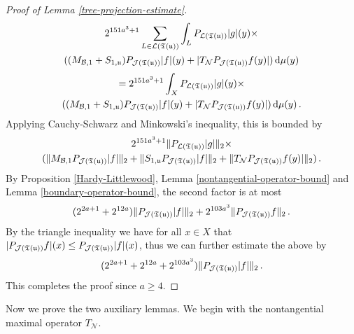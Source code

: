 {\begin{proof}[Proof of Lemma \ref{tree-projection-estimate}]
\begin{multline*}
        2^{151a^3 + 1} \sum_{L \in \mathcal{L}({\mathfrak T}({\mathfrak u}))} \int_L P_{\mathcal{L}({\mathfrak T}({\mathfrak u}))}|g|(y) \times \\((M_{\mathcal{B},1}+S_{1,{\mathfrak u}})P_{\mathcal{J}({\mathfrak T}({\mathfrak u}))}|f|(y)+|T_{\mathcal{N}}P_{\mathcal{J}({\mathfrak T}({\mathfrak u}))}f(y)| ) \, \mathrm{d}\mu(y)
    \end{multline*}
    \begin{multline*}
        = 2^{151a^3 + 1} \int_X P_{\mathcal{L}({\mathfrak T}({\mathfrak u}))}|g|(y)\times \\((M_{\mathcal{B},1}+S_{1,{\mathfrak u}})P_{\mathcal{J}({\mathfrak T}({\mathfrak u}))}|f|(y)+|T_{\mathcal{N}}P_{\mathcal{J}({\mathfrak T}({\mathfrak u}))}f(y)| ) \, \mathrm{d}\mu(y)\,.
    \end{multline*}
    Applying Cauchy-Schwarz and Minkowski's inequality, this is bounded by
    \begin{multline*}
        2^{151a^3 + 1} \|P_{\mathcal{L}({\mathfrak T}({\mathfrak u}))}|g|\|_2 \times \\(\|M_{\mathcal{B},1}P_{\mathcal{J}({\mathfrak T}({\mathfrak u}))}|f|\|_2 + \|S_{1,{\mathfrak u}}P_{\mathcal{J}({\mathfrak T}({\mathfrak u}))}|f|\|_2 + \|T_{\mathcal{N}}P_{\mathcal{J}({\mathfrak T}({\mathfrak u}))}f(y)|\|_2)\,.
    \end{multline*}
    By Proposition \ref{Hardy-Littlewood}, Lemma \ref{nontangential-operator-bound} and Lemma \ref{boundary-operator-bound}, the second factor is at most
    $$
        (2^{2a+1} + 2^{12a})\|P_{\mathcal{J}({\mathfrak T}({\mathfrak u}))}|f|\|_2 + 2^{103a^3} \|P_{\mathcal{J}({\mathfrak T}({\mathfrak u}))}f\|_2\,.
    $$
    By the triangle inequality we have for all $x \in X$ that $|P_{\mathcal{J}({\mathfrak T}({\mathfrak u}))}f|(x) \le P_{\mathcal{J}({\mathfrak T}({\mathfrak u}))}|f|(x)$, thus we can further estimate the above by
    $$
        (2^{2a+1} + 2^{12a} + 2^{103a^3}) \|P_{\mathcal{J}({\mathfrak T}({\mathfrak u}))}|f|\|_2\,.
    $$
    This completes the proof since $a \ge 4$.
\end{proof}

Now we prove the two auxiliary lemmas. We begin with the nontangential maximal operator $T_{\mathcal{N}}$.

}
